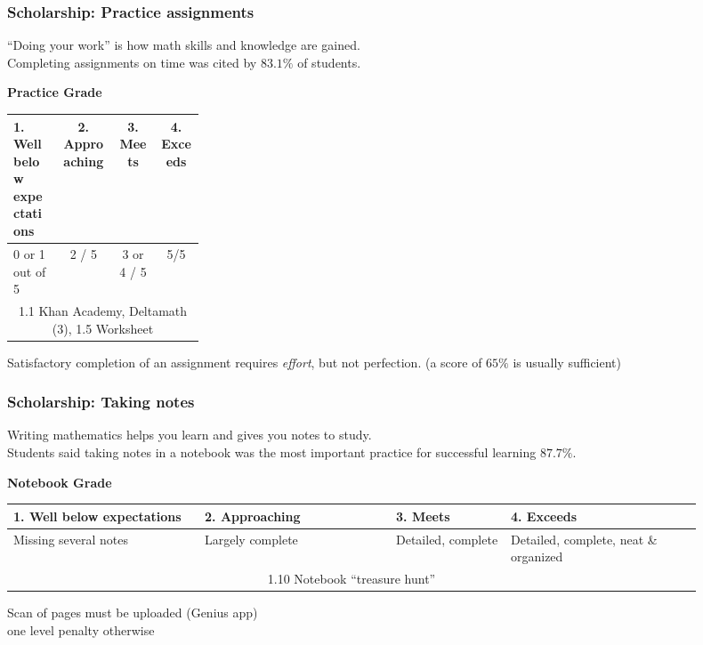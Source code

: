\documentclass{beamer}
\begin{document}
  \frame
  {
    \frametitle{Scholarship: Practice assignments}
      ``Doing your work'' is how math skills and knowledge are gained.\\[0.25cm]
      Completing assignments on time was cited by $83.1\%$ of students. \vspace{0.5cm}
      \begin{table}[ht]
        \textbf{Practice Grade}
      \begin{tabular}[t]{p{0.25\linewidth} c c c }%
        \hline
        1. Well below \newline expectations & 2. Approaching & 3. Meets & 4. Exceeds \\
        \hline
        \hspace{0.25cm} 0 or 1 out of 5 & 2 / 5 & 3 or 4 / 5 & 5/5 \\[0.25cm]
        \multicolumn{4}{c}{1.1 Khan Academy, Deltamath (3), 1.5 Worksheet} \\[0.25cm]
        \hline
      \end{tabular}
    \end{table} \vspace{0.25cm}
      Satisfactory completion of an assignment requires \emph{effort}, but not perfection. (a score of $65\%$ is usually sufficient)
      \vspace{1cm}
  }

  \frame
  {
    \frametitle{Scholarship: Taking notes}
      Writing mathematics helps you learn and gives you notes to study.\\[0.25cm]
      Students said taking notes in a notebook was the most important practice for successful learning $87.7\%$. \vspace{0.5cm}
      \begin{table}[ht]
        \textbf{Notebook Grade}
      \begin{tabular}[t]{p{0.25\linewidth} p{0.25\linewidth} p{0.15\linewidth} p{0.25\linewidth}}
        \hline
        1. Well below \newline expectations & 2. Approaching & 3. Meets & 4. Exceeds \\
        \hline
        Missing several notes & Largely complete & Detailed, \newline complete & Detailed, complete, neat \& organized \\[0.25cm]
        \multicolumn{4}{c}{1.10 Notebook ``treasure hunt''} \\[0.25cm]
        \hline
      \end{tabular}
    \end{table} \vspace{0.25cm}
      Scan of pages must be uploaded (Genius app) \\one level penalty otherwise
      \vspace{1cm}
  }
  
  
\end{document}
